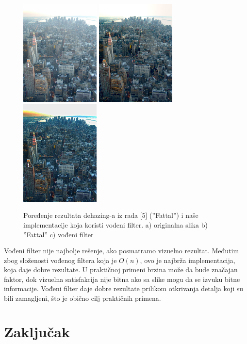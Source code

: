\documentclass[a4paper,12pt,titlepage]{article}
\begin{document}
\begin{figure}[ht!]
\centering
\includegraphics[width=40mm]{img/grad.jpg}
\includegraphics[width=40mm]{img/gradFattal.jpg}
\includegraphics[width=40mm]{img/gradDe.png}
\caption{Poređenje rezultata dehazing-a iz rada [5] (''Fattal'') i naše implementacije koja koristi vođeni filter. a) originalna slika b) ''Fattal'' c) vođeni filter}
\label{grad}
\end{figure} 

Vođeni filter nije najbolje rešenje, ako posmatramo vizuelno rezultat. Međutim zbog složenosti vođenog filtera koja je $O(n)$, ovo je najbrža implementacija, koja daje dobre rezultate. U praktičnoj primeni brzina može da bude značajan faktor, dok vizuelna satisfakcija nije bitna ako sa slike mogu da se izvuku bitne informacije. Vođeni filter daje dobre rezultate prilikom otkrivanja detalja koji su bili zamagljeni, što je obično cilj praktičnih primena.

\section{Zaključak}%
\end{document}
